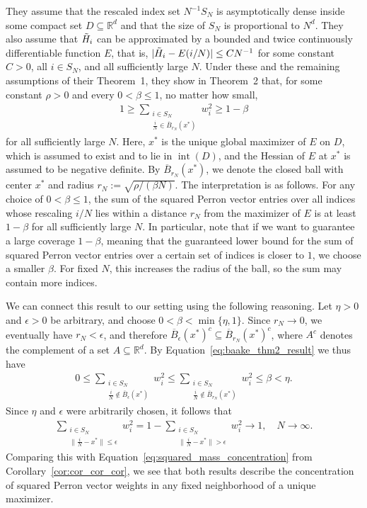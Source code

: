 They assume that the rescaled index set $N^{-1}S_N$ is asymptotically dense inside some compact set $D\subseteq\mathbb{R}^d$ and that the size of $S_N$ is proportional to $N^d$. They also assume that $\Tilde{H}_i$ can be approximated by a bounded and twice continuously differentiable function $E$, that is, $|\Tilde{H}_i-E(i/N)|\le CN^{-1}$ for some constant $C>0$, all $i\in S_N$, and all sufficiently large $N$. Under these and the remaining assumptions of their Theorem~1, they show in Theorem~2 that, for some constant $\rho>0$ and every $0<\beta\le1$, no matter how small,
\begin{align}\label{eq:baake_thm2_result}
    1\ge\sum_{\substack{i\in S_N\\\frac{i}{N}\in \overline{B}_{r_N}\left(x^{\ast}\right)}}w_i^2\ge1-\beta
\end{align}
for all sufficiently large $N$. Here, $x^{\ast}$ is the unique global maximizer of $E$ on $D$, which is assumed to exist and to lie in $\operatorname{int}(D)$, and the Hessian of $E$ at $x^{\ast}$ is assumed to be negative definite. By $\overline{B}_{r_N}(x^{\ast})$, we denote the closed ball with center $x^{\ast}$ and radius $r_N:=\sqrt{\rho/(\beta N)}$. The interpretation is as follows. For any choice of $0<\beta\le1$, the sum of the squared Perron vector entries over all indices whose rescaling $i/N$ lies within a distance $r_N$ from the maximizer of $E$ is at least $1-\beta$ for all sufficiently large $N$. In particular, note that if we want to guarantee a large coverage $1-\beta$, meaning that the guaranteed lower bound for the sum of squared Perron vector entries over a certain set of indices is closer to $1$, we choose a smaller $\beta$. For fixed $N$, this increases the radius of the ball, so the sum may contain more indices.


We can connect this result to our setting using the following reasoning. Let $\eta>0$ and $\epsilon>0$ be arbitrary, and choose $0<\beta<\min\{\eta,1\}$. Since $r_N\to0$, we eventually have $r_N<\epsilon$, and therefore $\overline{B}_{\epsilon}(x^{\ast})^c\subseteq\overline{B}_{r_N}(x^{\ast})^c$, where $A^c$ denotes the complement of a set $A\subseteq\mathbb{R}^d$. By Equation~\eqref{eq:baake_thm2_result} we thus have
\begin{align*}
    0\le\sum_{\substack{i\in S_N\\\frac{i}{N}\notin\overline{B}_{\epsilon}(x^{\ast})}}w_i^2\le
    \sum_{\substack{i\in S_N\\\frac{i}{N}\notin\overline{B}_{r_N}(x^{\ast})}}w_i^2\le\beta<\eta.
\end{align*}
Since $\eta$ and $\epsilon$ were arbitrarily chosen, it follows that
\begin{align*}
    \sum_{\substack{i\in S_N\\\|\frac{i}{N}-x^{\ast}\|\le\epsilon}}w_i^2=1-\sum_{\substack{i\in S_N\\\|\frac{i}{N}-x^{\ast}\|>\epsilon}}w_i^2\to1,\quad N\to\infty.
\end{align*}
Comparing this with Equation~\eqref{eq:squared_mass_concentration} from Corollary~\ref{cor:cor_cor_cor}, we see that both results describe the concentration of squared Perron vector weights in any fixed neighborhood of a unique maximizer.